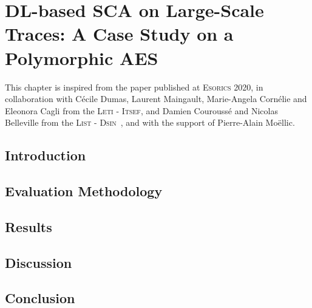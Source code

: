 \chapter{DL-based SCA on Large-Scale Traces: A Case Study on a Polymorphic AES}
\label{chap:dl_sca_practice}
This chapter is inspired from the paper published at \textsc{Esorics} 2020, in collaboration with Cécile Dumas, Laurent Maingault, Marie-Angela Cornélie and Eleonora Cagli from the \textsc{Leti - Itsef}, and Damien Couroussé and Nicolas Belleville from the \textsc{List - Dsin}~\cite{masure_deep_2020}, and with the support of Pierre-Alain Moëllic.
\minitoc
\newpage
\section{Introduction}
    \label{sec:intro_esorics}
    

\section{Evaluation Methodology}
    \label{sec:method}
    

\section{Results}
    \label{sec:results}
    

\section{Discussion}
    \label{sec:discussion}
    

\section{Conclusion}
    